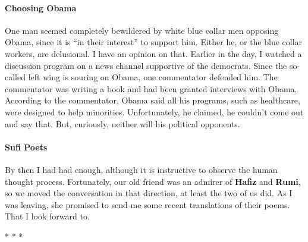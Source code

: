 \paragraph{Choosing Obama}


One man seemed completely bewildered by white blue collar men opposing Obama, since it is ``in their interest'' to support him. Either he, or the blue collar workers, are delusional. I have an opinion on that. Earlier in the day, I watched a discussion program on a news channel supportive of the democrats. Since the so-called left wing is souring on Obama, one commentator defended him. The commentator was writing a book and had been granted interviews with Obama. According to the commentator, Obama said all his programs, such as healthcare, were designed to help minorities. Unfortunately, he claimed, he couldn't come out and say that. But, curiously, neither will his political opponents.

\paragraph{Sufi Poets}


By then I had had enough, although it is instructive to observe the human thought process. Fortunately, our old friend was an admirer of \textbf{Hafiz} and \textbf{Rumi}, so we moved the conversation in that direction, at least the two of us did. As I was leaving, she promised to send me some recent translations of their poems. That I look forward to.



\begin{center}* * *\end{center}

